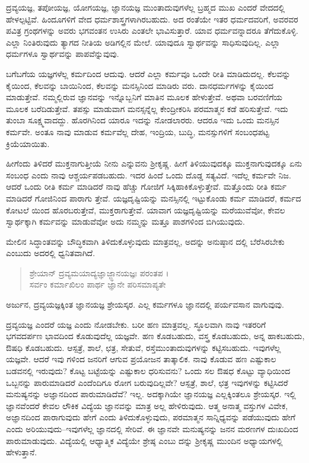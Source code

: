 ದ್ರವ್ಯಯಜ್ಞ, ತಪೋಯಜ್ಞ, ಯೋಗಯಜ್ಞ, ಜ್ಞಾನಯಜ್ಞ ಮುಂತಾದುವುಗಳೆಲ್ಲ ಬ್ರಹ್ಮದ ಮುಖ ಎಂದರೆ ವೇದದಲ್ಲಿ ಹೇಳಲ್ಪಟ್ಟಿವೆ. ಹಿಂದೂಗಳಿಗೆ ವೇದ ಧರ್ಮಶಾಸ್ತ್ರಗಳಾಗಿರಬಹುದು. ಅದ ರಂತೆಯೇ ಇತರ ಧರ್ಮದವರಿಗೆ, ಅವರವರ ಪವಿತ್ರ ಗ್ರಂಥಗಳನ್ನು ಅವರು ಭಗವಂತನ ಉಸಿರು ಎಂತಲೇ ಭಾವಿಸುತ್ತಾರೆ. ಯಾವ ಧರ್ಮವನ್ನಾದರೂ ತೆಗೆದುಕೊಳ್ಳಿ. ಎಲ್ಲಾ ನಿಂತಿರುವುದು ತ್ಯಾಗದ ನೀತಿಯ ಅಡಿಗಲ್ಲಿನ ಮೇಲೆ. ಯಾವುದೂ ಸ್ವಾರ್ಥವನ್ನು ಸಾಧಿಸುವುದಿಲ್ಲ. ಎಲ್ಲಾ ಧರ್ಮಗಳೂ ಸ್ವಾರ್ಥವನ್ನು ಪಾಪವೆನ್ನುವುವು.

ಬಗೆಬಗೆಯ ಯಜ್ಞಗಳೆಲ್ಲ ಕರ್ಮದಿಂದ ಆದುವು. ಆದರೆ ಎಲ್ಲಾ ಕರ್ಮವೂ ಒಂದೇ ರೀತಿ ಮಾಡಿದುದಲ್ಲ. ಕೆಲವನ್ನು ಕೈಯಿಂದ, ಕೆಲವನ್ನು ಬಾಯಿನಿಂದ, ಕೆಲವನ್ನು ಮನಸ್ಸಿನಿಂದ ಮಾಡಿರು ವರು. ದಾನಧರ್ಮಗಳನ್ನು ಕೈಯಿಂದ ಮಾಡುತ್ತೇವೆ. ನಮ್ಮಲ್ಲಿರುವ ಜ್ಞಾನವನ್ನು ಇನ್ನೊಬ್ಬನಿಗೆ ಮಾತಿನ ಮೂಲಕ ಹೇಳುತ್ತೇವೆ. ಅಥವಾ ಬರವಣಿಗೆಯ ಮೂಲಕ ಬರೆದಿಡುತ್ತೇವೆ. ತಪಸ್ಸು ಮಾಡುವಾಗ ಮನಸ್ಸನ್ನೆಲ್ಲ ಕೇಂದ್ರೀಕರಿಸಿ ಪರಮಾತ್ಮನ ಕಡೆ ಹರಿಸುತ್ತೇವೆ. ಇದು ತುಂಬಾ ಸೂಕ್ಷ್ಮವಾದದ್ದು. ಹೊರಗಿನಿಂದ ಯಾರೂ ಇದನ್ನು ನೋಡಲಾರರು. ಆದರೂ ಇದು ಒಂದು ಮನಸ್ಸಿನ ಕರ್ಮವೇ. ಅಂತೂ ನಾವು ಮಾಡುವ ಕರ್ಮವೆಲ್ಲ ದೇಹ, ಇಂದ್ರಿಯ, ಬುದ್ಧಿ, ಮನಸ್ಸುಗಳಿಗೆ ಸಂಬಂಧಪಟ್ಟ ಕ್ರಿಯೆಯಾಯಿತು.

ಹೀಗೆಂದು ತಿಳಿದರೆ ಮುಕ್ತನಾಗುತ್ತೀಯೆ ನೀನು ಎನ್ನುವನು ಶ್ರೀಕೃಷ್ಣ. ಹೀಗೆ ತಿಳಿಯುವುದಕ್ಕೂ ಮುಕ್ತನಾಗುವುದಕ್ಕೂ ಏನು ಸಂಬಂಧ ಎಂದು ನಾವು ಆಶ್ಚರ್ಯಪಡಬಹುದು. ಇದರ ಹಿಂದೆ ಒಂದು ದೊಡ್ಡ ಸತ್ಯವಿದೆ. ಇದೆಲ್ಲ ಕರ್ಮವೇ ನಿಜ. ಆದರೆ ಒಂದು ರೀತಿ ಕರ್ಮ ಮಾಡಿದರೆ ನಾವು ಹೆಚ್ಚು ಗೋಜಿಗೆ ಸಿಕ್ಕಿಹಾಕಿಕೊಳ್ಳುತ್ತೇವೆ. ಮತ್ತೊಂದು ರೀತಿ ಕರ್ಮ ಮಾಡಿದರೆ ಗೋಜಿನಿಂದ ಪಾರಾಗು ತ್ತೇವೆ. ಯಜ್ಞದೃಷ್ಟಿಯನ್ನು ಮನಸ್ಸಿನಲ್ಲಿ ಇಟ್ಟುಕೊಂಡು ಕರ್ಮ ಮಾಡಿದರೆ, ಕರ್ಮದ ಕೋಟಲೆ ಯಿಂದ ಹೊರಬರುತ್ತೇವೆ, ಮುಕ್ತರಾಗುತ್ತೇವೆ. ಯಾವಾಗ ಯಜ್ಞದೃಷ್ಟಿಯನ್ನು ಮರೆಯುವೆವೋ, ಕೇವಲ ಸ್ವಾರ್ಥಕ್ಕಾಗಿ ಕರ್ಮವನ್ನು ಮಾಡುವೆವೋ ಅದು ನಮ್ಮನ್ನು ಮತ್ತೂ ಪಾಶಗಳಿಂದ ಬಿಗಿಯುವುದು.

ಮೇಲಿನ ಸಿದ್ಧಾಂತವನ್ನು ಬೌದ್ಧಿಕವಾಗಿ ತಿಳಿದುಕೊಳ್ಳುವುದು ಮಾತ್ರವಲ್ಲ, ಅದನ್ನು ಅನುಷ್ಠಾನ ದಲ್ಲಿ ಬೆರೆಸಿರಬೇಕು ಎಂಬುದು ಅದರಲ್ಲಿ ಧ್ವನಿತವಾಗಿದೆ.

\begin{verse}
ಶ್ರೇಯಾನ್ ದ್ರವ್ಯಮಯಾದ್ಯಜ್ಞಾಜ್ಜ್ಞಾನಯಜ್ಞಃ ಪರಂತಪ ।\\ಸರ್ವಂ ಕರ್ಮಾಖಿಲಂ ಪಾರ್ಥ ಜ್ಞಾನೇ ಪರಿಸಮಾಪ್ಯತೇ 
\end{verse}

{\small ಅರ್ಜುನ, ದ್ರವ್ಯಯಜ್ಞಕ್ಕಿಂತ ಜ್ಞಾನಯಜ್ಞ ಶ್ರೇಯಸ್ಕರ. ಎಲ್ಲ ಕರ್ಮಗಳೂ ಜ್ಞಾನದಲ್ಲಿ ಪರ್ಯವಸಾನ ವಾಗುವುವು.}

ದ್ರವ್ಯಯಜ್ಞ ಎಂದರೆ  ಯಜ್ಞ ಎಂದು ನೋಡಬೇಕು. ಬರೀ ಹಣ ಮಾತ್ರವಲ್ಲ. ಸ್ಥೂಲವಾಗಿ ನಾವು ಇತರರಿಗೆ ಭಗವದರ್ಪಣ ಭಾವದಿಂದ ಕೊಡುವುದೆಲ್ಲ ಯಜ್ಞವೇ. ಹಣ ಕೊಡಬಹುದು, ವಸ್ತ್ರ ಕೊಡಬಹುದು, ಅನ್ನ ಹಾಕಬಹುದು, ಔಷಧಿ ಕೊಡಬಹುದು. ಆಸ್ಪತ್ರೆ, ಶಾಲೆ, ಛತ್ರ, ಸೇತುವೆ, ರಸ್ತೆಮುಂತಾದುವುಗಳನ್ನು ಕಟ್ಟಿಸಬಹುದು. ಇವುಗಳೆಲ್ಲ ಯಜ್ಞವೇ. ಆದರೆ ಇವು ಗಳಿಂದ ಜನರಿಗೆ ಆಗುವ ಪ್ರಯೋಜನ ತಾತ್ಕಾಲಿಕ. ನಾವು ಕೊಡುವ ಹಣ ಎಷ್ಟುಕಾಲ ಬಡವನಲ್ಲಿ ಇರುವುದು? ಕೊಟ್ಟ ಬಟ್ಟೆಯನ್ನು ಎಷ್ಟುಕಾಲ ಧರಿಸುವನು? ಒಂದು ಸಲ ಔಷಧ ಕೊಟ್ಟು ವ್ಯಾಧಿಯಿಂದ ಒಬ್ಬನನ್ನು ಪಾರುಮಾಡಿದರೆ ಎಂದೆಂದಿಗೂ ರೋಗ ಬರುವುದಿಲ್ಲವೇ? ಆಸ್ಪತ್ರೆ, ಶಾಲೆ, ಛತ್ರ ಇವುಗಳನ್ನು ಕಟ್ಟಿಸಿದರೆ ಮನುಷ್ಯನನ್ನು ಅಜ್ಞಾನದಿಂದ ಪಾರುಮಾಡಿದೆವೆ? ಇಲ್ಲ. ಅದಕ್ಕಾಗಿಯೇ ಜ್ಞಾನಯಜ್ಞ ಎಲ್ಲಕ್ಕಿಂತಲೂ ಶ್ರೇಯಸ್ಕರ. ಇಲ್ಲಿ ಜ್ಞಾನವೆಂದರೆ ಕೇವಲ ಲೌಕಿಕ ವಿದ್ಯೆಯ ಜ್ಞಾನವನ್ನು ಮಾತ್ರ ಅಲ್ಲ ಹೇಳಿರುವುದು. ಆತ್ಮ ಅನಾತ್ಮ ವಸ್ತುಗಳ ವಿವೇಕ, ಅಜ್ಞಾನದಿಂದ ಪಾರಾಗುವುದು ಹೇಗೆ ಎಂದು ತಿಳಿದುಕೊಳ್ಳುವುದು, ಪರಮಾತ್ಮನ ಸಾನ್ನಿಧ್ಯವನ್ನು ಪಡೆಯುವುದು ಹೇಗೆ ಎಂದು ಅರಿಯುವುದು–ಇವುಗಳೆಲ್ಲ ಜ್ಞಾನದಲ್ಲಿ ಸೇರಿವೆ. ಈ ಜ್ಞಾನವೇ ಮನುಷ್ಯನನ್ನು ಜನನ ಮರಣಗಳ ದುಃಖದಿಂದ ಪಾರುಮಾಡುವುದು. ವಿದ್ಯೆಯಲ್ಲಿ ಆಧ್ಯಾತ್ಮಿಕ ವಿದ್ಯೆಯೇ ಶ್ರೇಷ್ಠ ಎಂಬು ದನ್ನು ಶ್ರೀಕೃಷ್ಣ ಮುಂದಿನ ಅಧ್ಯಾಯಗಳಲ್ಲಿ ಹೇಳುತ್ತಾನೆ.


